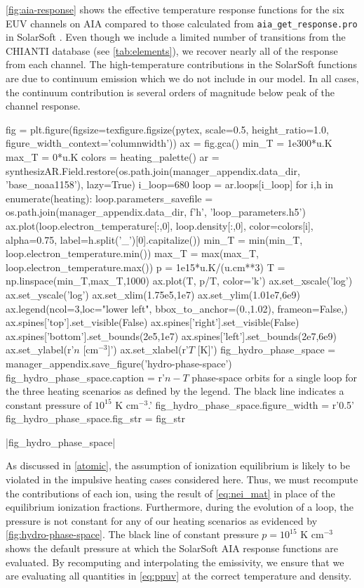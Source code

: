 \autoref{fig:aia-response} shows the effective temperature response functions for the six EUV channels on AIA compared to those calculated from \texttt{aia\_get\_response.pro} in SolarSoft \citep{freeland_data_1998}. Even though we include a limited number of transitions from the CHIANTI database (see \autoref{tab:elements}), we recover nearly all of the response from each channel. The high-temperature contributions in the SolarSoft functions are due to continuum emission which we do not include in our model. In all cases, the continuum contribution is several orders of magnitude below peak of the channel response.

\begin{pycode}
fig = plt.figure(figsize=texfigure.figsize(pytex, scale=0.5, height_ratio=1.0, 
                                           figure_width_context='columnwidth'))
ax = fig.gca()
min_T = 1e300*u.K
max_T = 0*u.K
colors = heating_palette()
ar = synthesizAR.Field.restore(os.path.join(manager_appendix.data_dir, 'base_noaa1158'), lazy=True)
i_loop=680
loop = ar.loops[i_loop]
for i,h in enumerate(heating):
    loop.parameters_savefile = os.path.join(manager_appendix.data_dir, f'{h}', 'loop_parameters.h5')
    ax.plot(loop.electron_temperature[:,0], loop.density[:,0], color=colors[i], alpha=0.75,
            label=h.split('_')[0].capitalize())
    min_T = min(min_T, loop.electron_temperature.min())
    max_T = max(max_T, loop.electron_temperature.max())
p = 1e15*u.K/(u.cm**3)
T = np.linspace(min_T,max_T,1000)
ax.plot(T, p/T, color='k')
ax.set_xscale('log')
ax.set_yscale('log')
ax.set_xlim(1.75e5,1e7)
ax.set_ylim(1.01e7,6e9)
ax.legend(ncol=3,loc="lower left", bbox_to_anchor=(0.,1.02), frameon=False,)
ax.spines['top'].set_visible(False)
ax.spines['right'].set_visible(False)
ax.spines['bottom'].set_bounds(2e5,1e7)
ax.spines['left'].set_bounds(2e7,6e9)
ax.set_ylabel(r'$n$ [cm$^{-3}$]')
ax.set_xlabel(r'$T$ [K]')
fig_hydro_phase_space = manager_appendix.save_figure('hydro-phase-space')
fig_hydro_phase_space.caption = r'$n-T$ phase-space orbits for a single loop for the three heating scenarios as defined by the legend. The black line indicates a constant pressure of $10^{15}$ K cm$^{-3}$.'
fig_hydro_phase_space.figure_width = r'0.5\columnwidth'
fig_hydro_phase_space.fig_str = fig_str
\end{pycode}
|fig_hydro_phase_space|

As discussed in \autoref{atomic}, the assumption of ionization equilibrium is likely to be violated in the impulsive heating cases considered here. Thus, we must recompute the contributions of each ion, using the result of \autoref{eq:nei_mat} in place of the equilibrium ionization fractions. Furthermore, during the evolution of a loop, the pressure is not constant for any of our heating scenarios as evidenced by \autoref{fig:hydro-phase-space}. The black line of constant pressure $p=10^{15}$ K cm$^{-3}$ shows the default pressure at which the SolarSoft AIA response functions are evaluated. By recomputing and interpolating the emissivity, we ensure that we are evaluating all quantities in \autoref{eq:ppuv} at the correct temperature and density.


